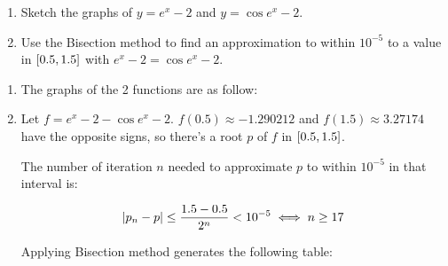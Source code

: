 \documentclass[../../../../Assignments.tex]{subfiles}
\begin{document}
\begin{exercise}
    \begin{enumerate}[label = (\alph*)]
        \item Sketch the graphs of \(y = e^x - 2\) and \(y = \cos{e^x - 2}\).
        \item Use the Bisection method to find an approximation to within
            \(10^{-5}\) to a value in \(\interval{\num{0.5}}{\num{1.5}}\) with
            \(e^x - 2 = \cos{e^x - 2}\).
    \end{enumerate}
\end{exercise}

\begin{solution}
    \begin{enumerate}[label = (\alph*)]
        \item The graphs of the 2 functions are as follow:

            \begin{center}
                
            \end{center}

        \item Let \(f = e^x - 2 - \cos{e^x - 2}\). \(f(\num{0.5}) \approx
            \num{-1.290212} \) and \(f(\num{1.5}) \approx \num{3.27174}\) have
            the opposite signs, so there's a root \(p\) of \(f\) in
            \(\interval{\num{0.5}}{\num{1.5}}\).

            The number of iteration \(n\) needed to approximate \(p\) to within
            \(10^{-5}\) in that interval is:

            \[\abs{p_n - p} \leq \frac{\num{1.5} - \num{0.5}}{2^n} < 10^{-5} \iff n \geq 17\]

            Applying Bisection method generates the following table:


\end{enumerate}
\end{solution}
\end{document}
